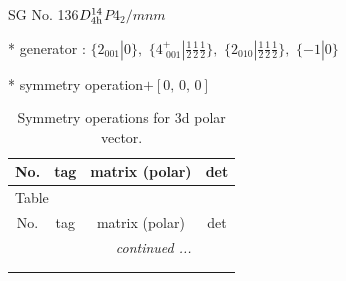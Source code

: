 \documentclass[fleqn,8pt]{jsarticle}
\begin{document}
\setcounter{MaxMatrixCols}{32}

\renewcommand{\tablename}{Table~}
\renewcommand{\figurename}{Figure~}
\begin{center}
\LARGE
SG No. 136\quad$D_{\rm 4h}^{14}$\quad$P4_2/mnm$\quad[ tetragonal ]
\end{center}

* generator : $\{2{}_{001}|0\},\,\,\{4^{+}_{\,\,001}|\frac{1}{2} \frac{1}{2} \frac{1}{2}\},\,\,\{2{}_{010}|\frac{1}{2} \frac{1}{2} \frac{1}{2}\},\,\,\{-1|0\}$

* symmetry operation\quad$+\left[ 0,\, 0,\, 0 \right]$
\renewcommand{\arraystretch}{1.3}
\begin{longtable}{cccc}
\caption{Symmetry operations for 3d polar vector.}
 \\
 \hline \hline
No. & tag & matrix (polar) & det \\ \hline \endfirsthead

\multicolumn{3}{l}{\tablename\ \thetable{}} \\
 \hline \hline
No. & tag & matrix (polar) & det \\ \hline \endhead

 \hline \hline
\multicolumn{3}{r}{\footnotesize\it continued ...} \\ \endfoot

 \hline \hline
\multicolumn{3}{r}{} \\ \endlastfoot


\end{longtable}
\end{document}
